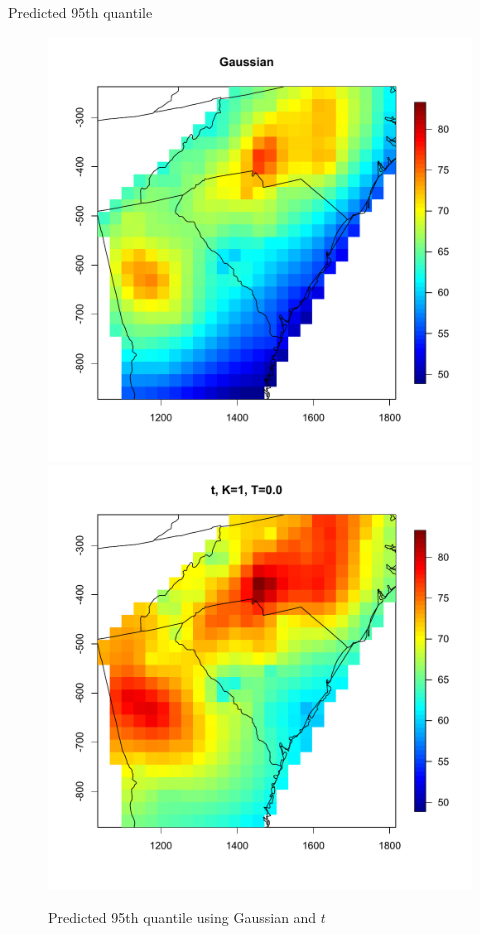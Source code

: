 \documentclass{beamer}
\begin{document}
\begin{frame}{Predicted 95th quantile}
\centering
\begin{figure}
    \includegraphics[width=.5\linewidth]{./plots/quantile-95-gau.pdf}
    \includegraphics[width=.5\linewidth]{./plots/quantile-95-t10.pdf}
    \caption{Predicted 95th quantile using Gaussian and $t$}
\end{figure}
\end{frame}
\end{document}
